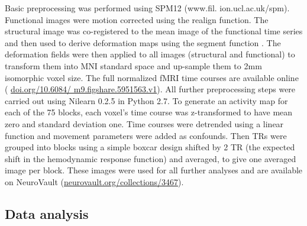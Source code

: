 \documentclass[fleqn,10pt]{SelfArx} %
\begin{document}
Basic preprocessing was performed using SPM12 (www.fil. ion.ucl.ac.uk/spm). Functional images were motion corrected using the realign function. The structural image was co-registered to the mean image of the functional time series and then used to derive deformation maps using the segment function \citep{Ashburner_2005}. The deformation fields were then applied to all images (structural and functional) to transform them into MNI standard space and up-sample them to 2mm isomorphic voxel size. The full normalized fMRI time courses are available online ( \href{https://doi.org/10.6084/m9.figshare.5951563.v1}{doi.org/10.6084/ m9.figshare.5951563.v1}). All further preprocessing steps were carried out using Nilearn 0.2.5 \citep{Abraham_2014} in Python 2.7. To generate an activity map for each of the 75 blocks, each voxel's time course was z-transformed to have mean zero and standard deviation one. Time courses were detrended using a linear function and movement parameters were added as confounds. Then TRs were grouped into blocks using a simple boxcar design shifted by 2 TR (the expected shift in the hemodynamic response function) and averaged, to give one averaged image per block. These images were used for all further analyses and are available on NeuroVault (\href{https://neurovault.org/collections/3467}{neurovault.org/collections/3467}). 

\subsection{Data analysis}
\end{document}
